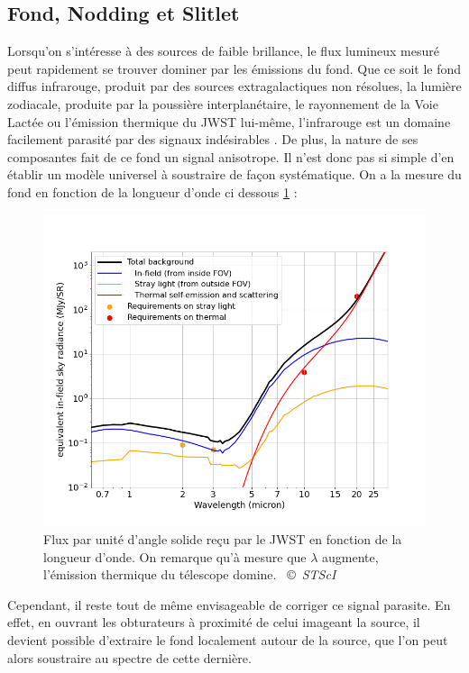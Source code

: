\documentclass[11pt, a4paper]{article}
\newcommand{\customcite}[2]{\mbox{
  {\small \copyright} \textit{#1} \cite{#2}}
}
\begin{document}
\subsection{Fond, Nodding et Slitlet}

Lorsqu'on s'intéresse à des sources de faible brillance, le flux lumineux mesuré peut rapidement se trouver dominer par les émissions du fond. Que ce soit le fond diffus infrarouge, produit par des sources extragalactiques non résolues, la lumière zodiacale, produite par la poussière interplanétaire, le rayonnement de la Voie Lactée ou l'émission thermique du JWST lui-même, l'infrarouge est un domaine facilement parasité par des signaux indésirables \cite{jwst_background}. De plus, la nature de ses composantes fait de ce fond un signal anisotrope. Il n'est donc pas si simple d'en établir un modèle universel à soustraire de façon systématique. On a la mesure du fond en fonction de la longueur d'onde ci dessous \ref{fig:background_jwst} : 

\begin{figure}[H]
  \centering
  \includegraphics[scale=0.4]{assets/background_jwst.png}
  \caption{Flux par unité d'angle solide reçu par le JWST en fonction de la longueur d'onde. On remarque qu'à mesure que $\lambda$ augmente, l'émission thermique du télescope domine. \customcite{STScI}{jwst_background}}
  \label{fig:background_jwst}
\end{figure}


Cependant, il reste tout de même envisageable de corriger ce signal parasite. En effet, en ouvrant les obturateurs à proximité de celui imageant la source, il devient possible d'extraire le fond localement autour de la source, que l'on peut alors soustraire au spectre de cette dernière.
\end{document}
